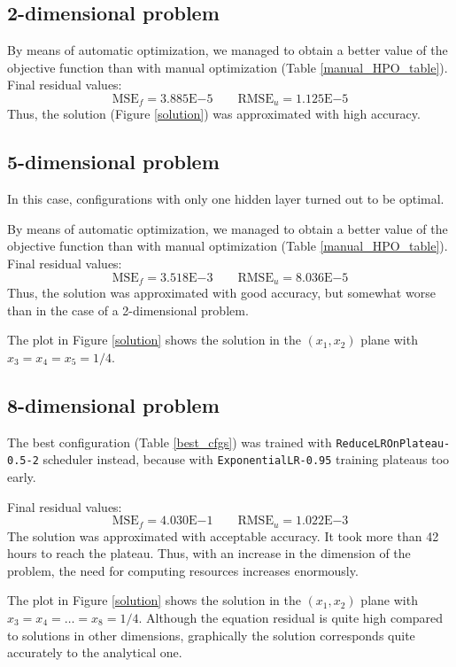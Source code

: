 \documentclass[reprint,
superscriptaddress,
amsmath,amssymb,aps,showkeys,showpacs,
twoside,final,secnumarabic,%
nofootinbib]{revtex4-2}
\begin{document}
\subsection{2-dimensional problem}
By means of automatic optimization, we managed to obtain a better value of the objective function than with manual optimization (Table \ref{manual_HPO_table}). Final residual values:
\[\mathrm{MSE}_f = 3.885\mathrm{E}{-5} \qquad \mathrm{RMSE}_u = 1.125\mathrm{E}{-5}\]
Thus, the solution (Figure \ref{solution}) was approximated with high accuracy.

\subsection{5-dimensional problem}
In this case, configurations with only one hidden layer turned out to be optimal.

By means of automatic optimization, we managed to obtain a better value of the objective function than with manual optimization (Table \ref{manual_HPO_table}). Final residual values:
\[\mathrm{MSE}_f = 3.518\mathrm{E}{-3} \qquad \mathrm{RMSE}_u = 8.036\mathrm{E}{-5}\]
Thus, the solution was approximated with good accuracy, but somewhat worse than in the case of a 2-dimensional problem.

The plot in Figure \ref{solution} shows the solution in the $(x_1, x_2)$ plane with $x_3 = x_4 = x_5 = 1/4$.

\subsection{8-dimensional problem}
The best configuration (Table \ref{best_cfgs}) was trained with \texttt{ReduceLROnPlateau-0.5-2} scheduler instead, because with \texttt{ExponentialLR-0.95} training plateaus too early.

Final residual values:
\[\mathrm{MSE}_f = 4.030\mathrm{E}{-1} \qquad \mathrm{RMSE}_u = 1.022\mathrm{E}{-3}\]
The solution was approximated with acceptable accuracy. It took more than 42 hours to reach the plateau. Thus, with an increase in the dimension of the problem, the need for computing resources increases enormously.



The plot in Figure \ref{solution} shows the solution in the $(x_1, x_2)$ plane with $x_3 = x_4 = \ldots = x_8 = 1/4$. Although the equation residual is quite high compared to solutions in other dimensions, graphically the solution corresponds quite accurately to the analytical one.
\end{document}
